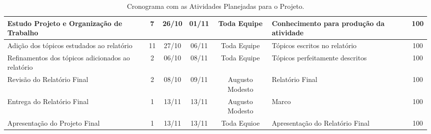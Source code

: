 \begin{landscape}
\begin{table}[h]
\begin{tabular}{|p{7cm}|c|c|c|c|p{4cm}|c|}
				Estudo Projeto e Organização de Trabalho & 7 & 26/10 & 01/11 & Toda Equipe & Conhecimento para produção da atividade & 100 \\ \hline
				Adição dos tópicos estudados ao relatório & 11 & 27/10 & 06/11 & Toda Equipe & Tópicos escritos no relatório & 100 \\ \hline
				Refinamentos dos tópicos adicionados ao relatório & 2 & 06/10 & 08/11 & Toda Equipe & Tópicos perfeitamente descritos & 100 \\ \hline
				Revisão do Relatório Final & 2 & 08/10 & 09/11 & Augusto Modesto & Relatório Final & 100 \\ \hline
				Entrega do Relatório Final & 1 & 13/11 & 13/11 & Augusto Modesto & Marco & 100 \\ \hline
				Apresentação do Projeto Final & 1 & 13/11 & 13/11 & Toda Equioe & Apresentação do Relatório Final & 100 \\ \hline

			\end{tabular}
			\caption[Cronograma com as Atividades Planejadas para o Projeto]{Cronograma com as Atividades Planejadas para o Projeto.}
			\label{tab:cronograma_.table}
		\end{table}

\end{landscape}

